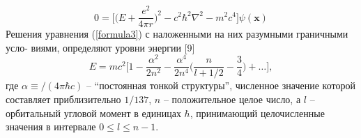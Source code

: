 \documentclass[a5paper, 10pt]{article}
\begin{document}
\begin{equation}
\label{formula3}
0 = \biggl[\biggl(E+\frac{e^2}{4\pi r}\biggr)^2-c^2\hbar^2\nabla^2-m^2c^4\biggr]\psi (\textbf{x})
\end{equation}
Решения уравнения (\ref{formula3}) с наложенными на них разумными граничными усло-
виями, определяют уровни энергии [9]
\begin{equation}
E = mc^2\biggl[1-\frac{\alpha^2}{2n^2}-\frac{\alpha^4}{2n^4}\biggl(\frac{n}{l+1/2}-\frac{3}{4}\biggl)+\ldots \biggr],
\end{equation}
где $\alpha\equiv /(4\pi\hbar c)$ -- ``постоянная тонкой структуры'', численное значение которой составляет приблизительно $1/137$, $n$ -- положительное целое число, а $l$ -- орбитальный угловой момент в единицах $\hbar$, принимающий целочисленные значения в интервале $0\le l\le n-1$.
\end{document}
